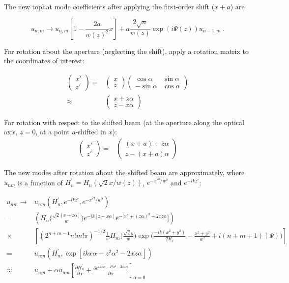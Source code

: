 \documentclass[aps,twoside,secnumarabic,balancelastpage,amsmath,amssymb,nofootinbib,hyperref=pdftex]{revtex4}
\begin{document}
The new tophat mode coefficients after applying the  first-order shift ($x+a$) are 

\begin{equation}
	u_{n,m} \rightarrow
     u_{n,m}
        \left[
        1 - \frac{2 a }{w(z)^2} x 
    \right]
    + 
	a \frac{2 \sqrt{n}}{w(z)} 
	\exp(i \Psi(z))
	u_{n-1,m} \; .
\end{equation}

For rotation about the aperture (neglecting the shift), apply a rotation matrix to the coordinates of interest:

\begin{align*}
\begin{pmatrix}
x' \\
z'
\end{pmatrix} 
=&
\begin{pmatrix}
x \\
z
\end{pmatrix} 
\begin{pmatrix}
\cos\alpha & \sin\alpha \\
-\sin\alpha & \cos\alpha
\end{pmatrix}
\\ \approx &
	\begin{pmatrix}
x+z\alpha \\
z - x\alpha
\end{pmatrix}
\end{align*}

For rotation with respect to the shifted beam (at the aperture along the optical axis, $z=0$, at a point $a$-shifted in $x$):
 \begin{align*}
\begin{pmatrix}
x' \\
z'
\end{pmatrix} 
=&
	\begin{pmatrix}
(x+a)+z\alpha \\
z - (x+a)\alpha
\end{pmatrix}
 \end{align*}

The new modes after rotation  about the shifted beam are approximately, where $u_{nm}$ is a function of $H_{n}^{'}=H_n(\sqrt{2}x/w(z))$, $e^{-x'^2/w^2}$ and $e^{-ikz'}$:

\begin{align*}
	u_{nm} \rightarrow&
	u_{nm} (H_{n}^{'}, e^{-ikz'},e^{-x'^2/w^2})
	\\=&
		(H_{n} \Big(\frac{\sqrt{2}[x+z\alpha]}{w} \Big) e^{-ik[z-x\alpha]} e^{-[x^2 + (z\alpha)^2+ 2xz\alpha}])
		\\ \times&
		[
		(2^{n+m-1}n!m!\pi)^{-1/2}
		\frac{1}{w}
		H_{m} \Big(\frac{\sqrt{2}y}{w} \Big)
		\exp \Big(\frac{-ik(x^{2}+y^{2})}{2R_{c}}-
		\frac{x^{2}+y^{2}}{w^{2}} 
		+i(n+m+1)(\Psi)		
		\Big)
		]\;
			\\=&
	u_{nm}(H_{n}^{'}, \exp[ikx\alpha -z^2\alpha^2 - 2xz\alpha])
	\\ \approx &
	u_{nm} + \alpha u_{nm}[ \frac{\partial  H_{n}^{'} }{\partial\alpha}   + \frac{\partial e^{ikx\alpha-z^2\alpha^2 - 2xz\alpha}}{\partial \alpha} ]_{\alpha=0}
\end{align*}
\end{document}
